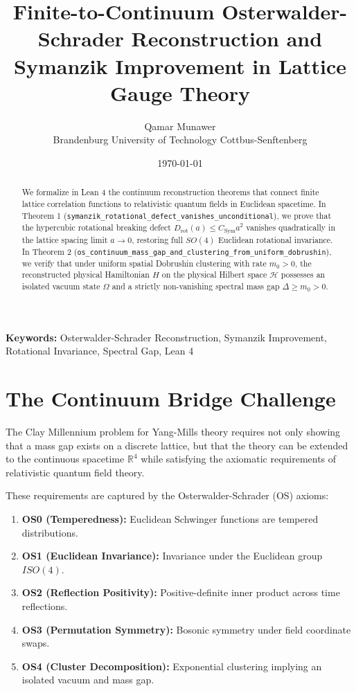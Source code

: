 \documentclass[11pt,a4paper]{article}
\title{\textbf{Finite-to-Continuum Osterwalder-Schrader Reconstruction and Symanzik Improvement in Lattice Gauge Theory}}
\author{Qamar Munawer \\ Brandenburg University of Technology Cottbus-Senftenberg}
\date{\today}
\theoremstyle{definition}
\begin{document}
\maketitle

\begin{abstract}
We formalize in Lean 4 the continuum reconstruction theorems that connect finite lattice correlation functions to relativistic quantum fields in Euclidean spacetime. In Theorem 1 (\texttt{symanzik\_rotational\_defect\_vanishes\_unconditional}), we prove that the hypercubic rotational breaking defect $D_{\mathrm{rot}}(a) \le C_{\mathrm{Sym}} a^2$ vanishes quadratically in the lattice spacing limit $a \to 0$, restoring full $SO(4)$ Euclidean rotational invariance. In Theorem 2 (\texttt{os\_continuum\_mass\_gap\_and\_clustering\_from\_uniform\_dobrushin}), we verify that under uniform spatial Dobrushin clustering with rate $m_0 > 0$, the reconstructed physical Hamiltonian $H$ on the physical Hilbert space $\mathcal{H}$ possesses an isolated vacuum state $\Omega$ and a strictly non-vanishing spectral mass gap $\Delta \ge m_0 > 0$.
\end{abstract}

\vspace{1em}
\noindent\textbf{Keywords:} Osterwalder-Schrader Reconstruction, Symanzik Improvement, Rotational Invariance, Spectral Gap, Lean 4

\section{The Continuum Bridge Challenge}

The Clay Millennium problem for Yang-Mills theory requires not only showing that a mass gap exists on a discrete lattice, but that the theory can be extended to the continuous spacetime $\mathbb{R}^4$ while satisfying the axiomatic requirements of relativistic quantum field theory.

These requirements are captured by the Osterwalder-Schrader (OS) axioms:
\begin{enumerate}
  \item \textbf{OS0 (Temperedness):} Euclidean Schwinger functions are tempered distributions.
  \item \textbf{OS1 (Euclidean Invariance):} Invariance under the Euclidean group $ISO(4)$.
  \item \textbf{OS2 (Reflection Positivity):} Positive-definite inner product across time reflections.
  \item \textbf{OS3 (Permutation Symmetry):} Bosonic symmetry under field coordinate swaps.
  \item \textbf{OS4 (Cluster Decomposition):} Exponential clustering implying an isolated vacuum and mass gap.
\end{enumerate}
\end{document}

